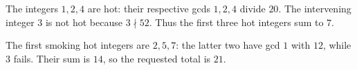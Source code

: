 The integers $1,2,4$ are hot: their respective gcds $1,2,4$ divide $20$. The intervening integer $3$ is not hot because $3\nmid52$. Thus the first three hot integers sum to $7$.

The first smoking hot integers are $2,5,7$: the latter two have gcd $1$ with $12$, while $3$ fails. Their sum is $14$, so the requested total is $\boxed{21}$.
